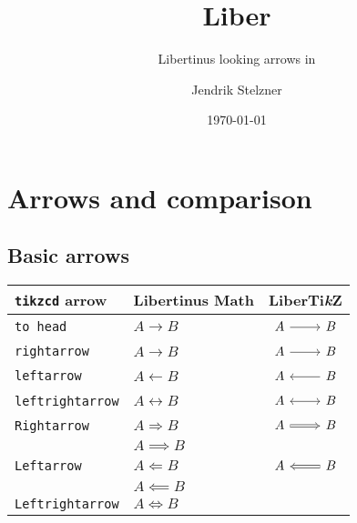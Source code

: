 \documentclass{scrartcl}
\title{Liber\tikzlogo{}}
\subtitle{Libertinus looking arrows in \tikzlogo{}}
\author{Jendrik Stelzner}
\date{\today}
\newcommand{\tikzlogo}{Ti\textit{\textrm{k}}Z}
\newcommand{\tablehead}{\textbf}
\newcommand{\tipname}{\texttt}
\begin{document}
\maketitle





\section{Arrows and comparison}


\subsection{Basic arrows}

\begin{longtable}{l@{\qquad}l@{\qquad}c}
	\toprule
	\tablehead{\texttt{tikzcd} arrow}
	&
	\tablehead{Libertinus Math}
	&
	\tablehead{Liber\tikzlogo{}}
	\\
	\midrule
	\tipname{to head}
	&
	$A \longrightarrow B$
	&
	$\begin{tikzcd} A \arrow[to head]{r} & B \end{tikzcd}$
	\\
	\tipname{rightarrow}
	&
	$A \longrightarrow B$
	&
	$\begin{tikzcd} A \arrow[rightarrow]{r} & B \end{tikzcd}$
	\\
	\tipname{leftarrow}
	&
	$A \longleftarrow B$
	&
	$\begin{tikzcd} A \arrow[leftarrow]{r} & B \end{tikzcd}$
	\\
	\tipname{leftrightarrow}
	&
	$A \longleftrightarrow B$
	&
	$\begin{tikzcd} A \arrow[leftrightarrow]{r} & B \end{tikzcd}$
	\\
	\tipname{Rightarrow}
	&
	$A \Rightarrow B$
	&
	$\begin{tikzcd} A \arrow[Rightarrow]{r} & B \end{tikzcd}$
	\\
	{}
	&
	$A \implies B$
	&
	{}
	\\
	\tipname{Leftarrow}
	&
	$A \Leftarrow B$
	&
	$\begin{tikzcd} A \arrow[Leftarrow]{r} & B \end{tikzcd}$
	\\
	{}
	&
	$A \impliedby B$
	&
	{}
	\\
	\tipname{Leftrightarrow}
	&
	$A \Leftrightarrow B$

\end{longtable}
\end{document}
